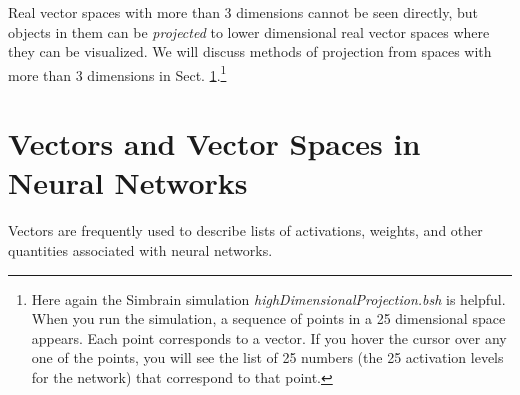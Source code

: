    Real vector spaces with more than 3 dimensions cannot be seen directly, but 
objects in them can be \emph{projected} to lower dimensional real vector spaces 
where they can be visualized. We will discuss methods of projection from 
spaces with more than 3 dimensions in Sect. \ref{S:dimReduction}.\footnote{Here
again the Simbrain simulation \emph{highDimensionalProjection.bsh} is helpful.
When you run the simulation, a sequence of points in a 25 dimensional space 
appears. Each point corresponds to a vector. If you hover the cursor over any
one of the points, you will see the list of 25 numbers (the 25 activation levels
for the network) that correspond to that point.}

\section{Vectors and Vector Spaces in Neural Networks}\label{S:dimReduction}

   Vectors are frequently used to describe lists of activations, weights, and other quantities associated with neural networks. 

